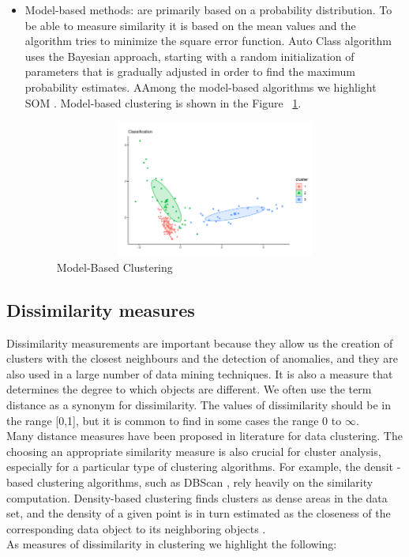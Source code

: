 \begin{itemize}
  \item Model-based methods: are primarily based on a probability distribution. To be able to measure similarity it is based on the mean values and the algorithm tries to minimize the square error function. Auto Class algorithm uses the Bayesian approach, starting with a random initialization of parameters that is gradually adjusted in order to find the maximum probability estimates. AAmong the model-based algorithms we highlight SOM \citep{b34}. Model-based clustering is shown in the Figure ~\ref{fig:model}.
    \begin{figure}[htbp]
  \centering
   \includegraphics[width=14cm, height=4.5cm]{img/model}
    \caption{Model-Based Clustering}
    \label{fig:model}%
\end{figure}
\end{itemize}

\subsection*{Dissimilarity measures}

Dissimilarity measurements are important because they allow us the creation of clusters with the closest neighbours and the detection of anomalies, and they are also used in a large number of data mining techniques. It is also a measure that determines the degree to which objects are different. We often use the term distance as a synonym for dissimilarity. The values of dissimilarity should be in the range [0,1], but it is common to find in some cases the range 0 to $\infty$.
\\
Many distance measures have been proposed in literature for data clustering. The choosing an appropriate similarity measure is also crucial for cluster analysis, especially for a particular type of clustering algorithms. For example, the densit -based clustering algorithms, such as DBScan \citep{b28}, rely heavily on the similarity computation. Density-based clustering finds clusters as dense areas in the data set, and the density of a given point is in turn estimated as the closeness of the corresponding data object to its neighboring objects \citep{b50} \citep{b51}.
\\
As measures of dissimilarity in clustering we highlight the following:

